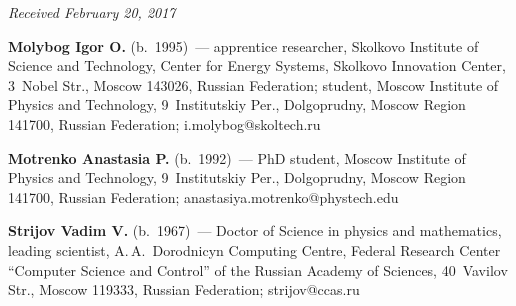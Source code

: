 \vspace*{-3pt}

\hfill{\small\textit{Received February 20, 2017}}

\Contr

\noindent
\textbf{Molybog Igor O.} (b.\ 1995)~--- 
apprentice researcher, Skolkovo Institute of Science and Technology, 
Center for Energy Systems, Skolkovo Innovation Center, 3~Nobel Str., Moscow 143026, 
Russian Federation; student, Moscow Institute of Physics and Technology, 
9~Institutskiy Per., Dolgoprudny, Moscow Region 141700, Russian Federation; 
\mbox{i.molybog@skoltech.ru}

\vspace*{5pt} 

\noindent
\textbf{Motrenko Anastasia P.} (b.\ 1992)~--- 
PhD student, Moscow Institute of Physics and Technology, 
9~Institutskiy Per., Dolgoprudny, Moscow Region 141700, Russian Federation; 
\mbox{anastasiya.motrenko@phystech.edu}

\vspace*{5pt}

\noindent
\textbf{Strijov Vadim V.} (b.\ 1967)~--- 
Doctor of Science in physics and mathematics, leading scientist, A.\,A.~Dorodnicyn 
Computing Centre, Federal Research Center ``Computer Science and Control'' 
of the Russian Academy of Sciences, 40~Vavilov Str., Moscow 119333, 
Russian Federation; \mbox{strijov@ccas.ru}


\label{end\stat}


\renewcommand{\bibname}{\protect\rm Литература} 